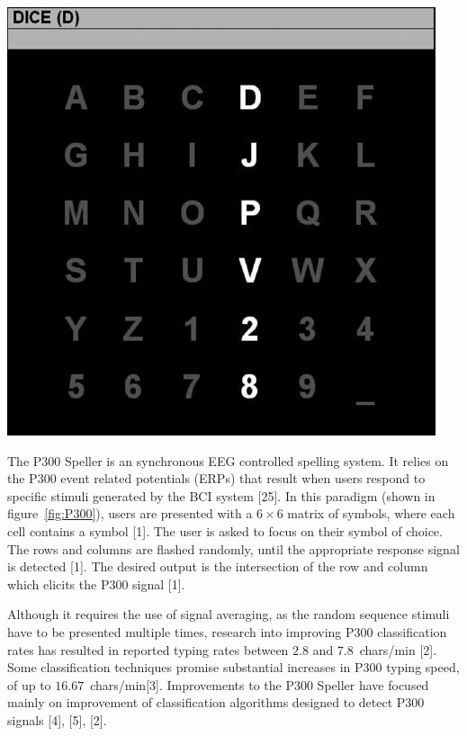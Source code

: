 \documentclass[12pt,titlepage]{article}
\begin{document}
\begin{center}
	\includegraphics[scale=0.40]{Figure2.jpeg}
	\label{fig:P300}
\end{center}

The P300 Speller is an synchronous EEG controlled spelling system.   It relies on the P300 event 
related potentials (ERPs) that result when users respond to specific stimuli generated by the BCI 
system [25].  In this paradigm (shown in figure~\ref{fig:P300}), users are presented with a $6\times6$ matrix of symbols, where 
each cell contains a symbol [1].  The user is asked to focus on their symbol of choice.  The rows and 
columns are flashed randomly, until the appropriate response signal is detected [1].  The desired output
is the intersection of the row and column which elicits the P300 signal [1].

Although it requires the use of signal averaging, as the random sequence stimuli have to be presented 
multiple times, research into improving P300 classification rates has resulted in reported typing rates 
between $2.8$ and $7.8$~chars/min [2].  Some classification techniques promise substantial increases in 
P300 typing speed, of up to $16.67$~chars/min[3].  Improvements to the P300 Speller have focused mainly 
on improvement of classification algorithms designed to detect P300 signals [4], [5], [2].
\end{document}
